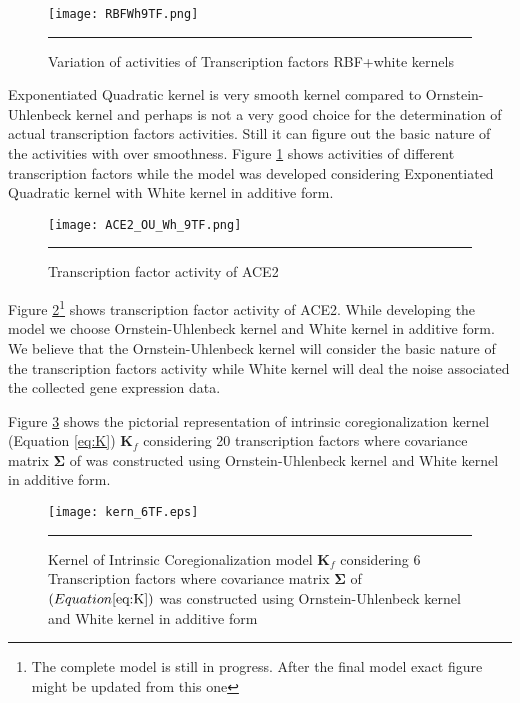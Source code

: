 \begin{figure}[t]
	\centering
		\texttt{[image: RBFWh9TF.png]}
		\rule{35em}{0.5pt}
	\caption[Variation of activities of Transcription factors with RBF+white kernels]
		{Variation of activities of Transcription factors RBF+white kernels}
	\label{fig:TFA_with_RBFnWhKernel}
\end{figure}

Exponentiated Quadratic kernel is very smooth kernel compared to Ornstein-Uhlenbeck kernel and 
perhaps is not a very good choice for the determination of actual transcription factors activities.
Still it can figure out the basic nature of the activities with over smoothness.
Figure \ref{fig:TFA_with_RBFnWhKernel} shows activities of different transcription factors while
the model was developed considering Exponentiated Quadratic kernel with White kernel in additive form.


\begin{figure}[t]
	\centering
		\texttt{[image: ACE2\_OU\_Wh\_9TF.png]}
		\rule{35em}{0.5pt}
	\caption[Transcription factor activity of ACE2]
		{Transcription factor activity of ACE2}
	\label{fig:TFA_of_of_ACE2}
\end{figure}

Figure \ref{fig:TFA_of_of_ACE2}\footnote{The complete model is still in progress. 
After the final model exact figure might be updated from this one}
shows transcription factor activity of ACE2.
While developing the model we choose Ornstein-Uhlenbeck kernel and White kernel in additive form.
We believe that the Ornstein-Uhlenbeck kernel will consider the basic nature of the transcription
factors activity while White kernel will deal the noise associated the collected gene expression
data.

Figure \ref{fig:kern_6TF} shows the pictorial representation of intrinsic coregionalization kernel 
(Equation \ref{eq:K}) $\textbf{K}_f$ considering 20 transcription factors 
where covariance matrix $\boldsymbol{\Sigma}$ of  was 
constructed using Ornstein-Uhlenbeck kernel and White kernel in additive form.

\begin{figure}[t]
	\centering
		\texttt{[image: kern\_6TF.eps]}
		\rule{35em}{0.5pt}
	\caption[Kernel of Intrinsic Coregionalization model $\textbf{K}_f$ considering 6 
		 Transcription factors where covariance matrix $\boldsymbol{\Sigma}$
		 was constructed using Ornstein-Uhlenbeck kernel and White kernel in additive form]
		{Kernel of Intrinsic Coregionalization model $\textbf{K}_f$ considering 6 
		 Transcription factors where covariance matrix $\boldsymbol{\Sigma}$ 
		 of $\left( Equation \ref{eq:K} \right)$ was constructed 
		 using Ornstein-Uhlenbeck kernel and White kernel in additive form}
	\label{fig:kern_6TF}
\end{figure}



